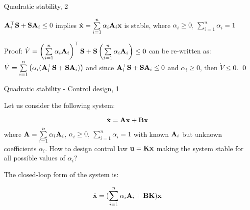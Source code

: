 \documentclass{beamer}
\begin{document}
	\begin{frame}{Quadratic stability, 2}
		\begin{flushleft}
			
			\begin{theorem}
				$\mathbf{A}_i^\top \mathbf{S} + \mathbf{S} \mathbf{A}_i \leq 0$ implies $\dot{\mathbf{x}} = \sum\limits_{i=1}^{n} \alpha_i \mathbf{A}_i \mathbf{x}$ is stable, where $\alpha_i \geq 0$, $\sum\limits_{i=1}^{n} \alpha_i = 1$
			\end{theorem}
			
			\bigskip
			
			Proof: $\dot V = \left(\sum\limits_{i=1}^{n} \alpha_i \mathbf{A}_i \right)^\top \mathbf{S} + \mathbf{S} 
			\left( \sum\limits_{i=1}^{n} \alpha_i \mathbf{A}_i \right) \leq 0$ can be re-written as: 
			$\dot V = \sum\limits_{i=1}^{n} \left( \alpha_i (\mathbf{A}_i^\top \mathbf{S} + \mathbf{S} \mathbf{A}_i) \right) $ and since $\mathbf{A}_i^\top \mathbf{S} + \mathbf{S} \mathbf{A}_i \leq 0$ and $\alpha_i \geq 0$, then $\dot V \leq 0$. \qed
			
		\end{flushleft}
	\end{frame}
	
	
	
	
	\begin{frame}{Quadratic stability - Control design, 1}
		\begin{flushleft}
			
			Let us consider the following system:
			
			\begin{equation}
				\dot{\mathbf{x}} = \mathbf{A}\mathbf{x} + \mathbf{B}\mathbf{x}
			\end{equation}
			where $\mathbf{A} = \sum\limits_{i=1}^{n} \alpha_i \mathbf{A}_i$, $\alpha_i \geq 0$, $\sum\limits_{i=1}^{n} \alpha_i = 1$ with known $\mathbf{A}_i$ but unknown coefficients $\alpha_i$. How to design control law $\mathbf{u} = \mathbf{K}\mathbf{x}$ making the system stable for all possible values of $\alpha_i$? 
			
			\bigskip
			
			The closed-loop form of the system is:
			
			\begin{equation}
				\dot{\mathbf{x}} = (\sum\limits_{i=1}^{n} \alpha_i \mathbf{A}_i + \mathbf{B}\mathbf{K})\mathbf{x}
			\end{equation}
			
			
		\end{flushleft}
	\end{frame}
	
\end{document}
